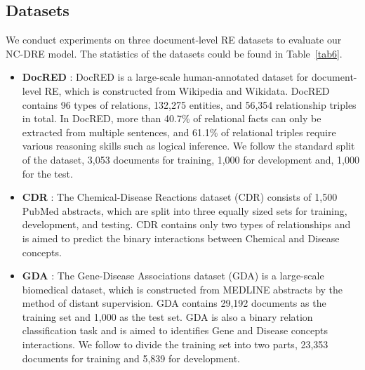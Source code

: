 \documentclass[sigconf,natbib=true]{acmart}
\begin{document}
\subsection{Datasets}
We conduct experiments on three document-level RE datasets to evaluate our NC-DRE model. 
The statistics of the datasets could be found in Table~\ref{tab6}.
\begin{itemize}
\item \textbf{DocRED} \cite{c:105}:
DocRED is a large-scale human-annotated dataset for document-level RE, which is constructed from Wikipedia and Wikidata. DocRED contains 96 types of relations, 132,275 entities, and 56,354 relationship triples in total. 
In DocRED, more than 40.7\% of relational facts can only be extracted from multiple sentences, and 61.1\% of relational triples require various reasoning skills such as logical inference. 
We follow the standard split of the dataset, 3,053 documents for training, 1,000 for development and, 1,000 for the test.
\item \textbf{CDR} \cite{c:122}:
The Chemical-Disease Reactions dataset (CDR) consists of 1,500 PubMed abstracts, which are split into three equally sized sets for training, development, and testing. 
CDR contains only two types of relationships and is aimed to predict the binary interactions between Chemical and Disease concepts. 
\item \textbf{GDA} \cite{c:123}:
The Gene-Disease Associations dataset (GDA) is a large-scale biomedical dataset, which is constructed from MEDLINE abstracts by the method of distant supervision.
GDA contains 29,192 documents as the training set and 1,000 as the test set. 
GDA is also a binary relation classification task and is aimed to identifies Gene and Disease concepts interactions. 
We follow \cite{c:108} to divide the training set into two parts, 23,353 documents for training and 5,839 for development.
\end{itemize}
\end{document}
